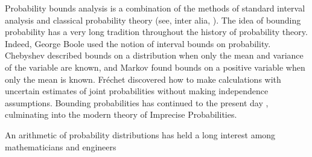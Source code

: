 \documentclass{juliacon}
\begin{document}
\iffalse
Probability bounds analysis is a combination of the methods of standard interval analysis \cite{moore1996interval, jaulin2001interval} and classical probability theory (see, inter alia, \cite{feller1968probability, feller1971probability}).  The idea of bounding probability has a very long tradition throughout the history of probability theory. Indeed, George Boole \cite{boole1854investigation, hailperin1986boole} used the notion of interval bounds on probability. Chebyshev \cite{chebyshev1874valeurs} described bounds on a distribution when only the mean and variance of the variable are known, and Markov \cite{markoff1900question} found bounds on a positive variable when only the mean is known. Fréchet \cite{frechet1935generalisation} discovered how to make calculations with uncertain estimates of joint probabilities without making independence assumptions. Bounding probabilities has continued to the present day \cite{walley1991statistical, klir2013uncertainty, troffaes2014lower, augustin2014introduction}, culminating into the modern theory of Imprecise Probabilities.

An arithmetic of probability distributions has held a long interest among mathematicians and engineers
\end{document}
